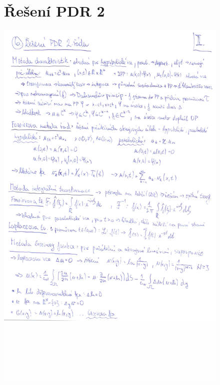 \documentclass[a4]{report}
\theoremstyle{definition}
\begin{document}
\begin{figure}[H]
\section{Řešení PDR 2}
\includegraphics[width=\textwidth]{2-6a.jpg}
\end{figure}
\end{document}
